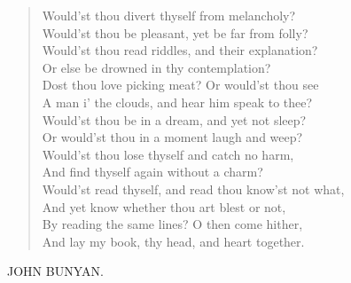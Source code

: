 \begin{verse}
Would'st thou divert thyself from melancholy?\\
Would'st thou be pleasant, yet be far from folly?\\
Would'st thou read riddles, and their explanation?\\
Or else be drowned in thy contemplation?\\
Dost thou love picking meat? Or would'st thou see\\
A man i' the clouds, and hear him speak to thee?\\
Would'st thou be in a dream, and yet not sleep?\\
Or would'st thou in a moment laugh and weep?\\
Would'st thou lose thyself and catch no harm,\\
And find thyself again without a charm?\\
Would'st read thyself, and read thou know'st not what,\\
And yet know whether thou art blest or not,\\
By reading the same lines? O then come hither,\\
And lay my book, thy head, and heart together.\\
\end{verse}


JOHN BUNYAN.\\
